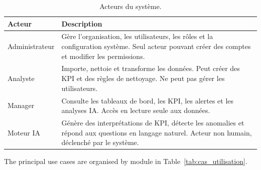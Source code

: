\begin{table}[h!]
\centering
\caption{Acteurs du système.}
\label{tab:acteurs}
\begin{tabular}{|l|p{8cm}|}
\hline
\textbf{Acteur} & \textbf{Description} \\
\hline
Administrateur & Gère l'organisation, les utilisateurs,
                 les rôles et la configuration système.
                 Seul acteur pouvant créer des comptes
                 et modifier les permissions. \\
\hline
Analyste & Importe, nettoie et transforme les données.
           Peut créer des KPI et des règles de nettoyage.
           Ne peut pas gérer les utilisateurs. \\
\hline
Manager & Consulte les tableaux de bord, les KPI,
          les alertes et les analyses IA.
          Accès en lecture seule aux données. \\
\hline
Moteur IA & Génère des interprétations de KPI,
            détecte les anomalies et répond
            aux questions en langage naturel.
            Acteur non humain, déclenché par le système. \\
\hline
\end{tabular}
\end{table}

\noindent
The principal use cases are organised by module
in Table~\ref{tab:cas_utilisation}.

